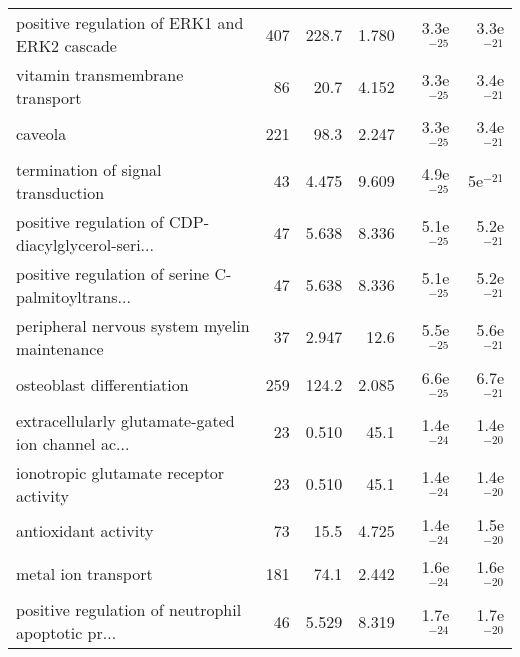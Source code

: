 \begin{longtable}{lrrrrr}
      positive regulation of ERK1 and ERK2 cascade &                     407 &                   228.7 &      1.780 &         3.3e$^{-25}$ &         3.3e$^{-21}$ \\
                   vitamin transmembrane transport &                      86 &                    20.7 &      4.152 &         3.3e$^{-25}$ &         3.4e$^{-21}$ \\
                                           caveola &                     221 &                    98.3 &      2.247 &         3.3e$^{-25}$ &         3.4e$^{-21}$ \\
                termination of signal transduction &                      43 &                   4.475 &      9.609 &         4.9e$^{-25}$ &           5e$^{-21}$ \\
 positive regulation of CDP-diacylglycerol-seri... &                      47 &                   5.638 &      8.336 &         5.1e$^{-25}$ &         5.2e$^{-21}$ \\
 positive regulation of serine C-palmitoyltrans... &                      47 &                   5.638 &      8.336 &         5.1e$^{-25}$ &         5.2e$^{-21}$ \\
      peripheral nervous system myelin maintenance &                      37 &                   2.947 &       12.6 &         5.5e$^{-25}$ &         5.6e$^{-21}$ \\
                        osteoblast differentiation &                     259 &                   124.2 &      2.085 &         6.6e$^{-25}$ &         6.7e$^{-21}$ \\
 extracellularly glutamate-gated ion channel ac... &                      23 &                   0.510 &       45.1 &         1.4e$^{-24}$ &         1.4e$^{-20}$ \\
            ionotropic glutamate receptor activity &                      23 &                   0.510 &       45.1 &         1.4e$^{-24}$ &         1.4e$^{-20}$ \\
                              antioxidant activity &                      73 &                    15.5 &      4.725 &         1.4e$^{-24}$ &         1.5e$^{-20}$ \\
                               metal ion transport &                     181 &                    74.1 &      2.442 &         1.6e$^{-24}$ &         1.6e$^{-20}$ \\
 positive regulation of neutrophil apoptotic pr... &                      46 &                   5.529 &      8.319 &         1.7e$^{-24}$ &         1.7e$^{-20}$ \\

\end{longtable}

